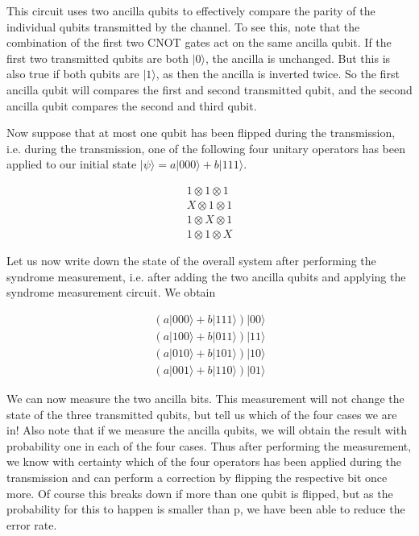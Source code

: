\documentclass[a4paper, draft]{article}
\theoremstyle{own}
\theoremstyle{remark}
\begin{document}
This circuit uses two ancilla qubits to effectively compare the parity of the individual qubits transmitted by the channel. To see this, note that the combination of the first two CNOT gates act on the same ancilla qubit. If the first two transmitted qubits are both $|0 \rangle$, the ancilla is unchanged. But this is also true if both qubits are $|1 \rangle$, as then the ancilla is inverted twice. So the first ancilla qubit will compares the first and second transmitted qubit, and the second ancilla qubit compares the second and third qubit.

Now suppose that at most one qubit has been flipped during the transmission, i.e. during the transmission, one of the following four unitary operators has been applied to our initial state $|\psi \rangle = a |000 \rangle + b |111 \rangle$. 

\begin{align*}
1 \otimes 1 \otimes 1 \\
X \otimes 1 \otimes 1 \\
1 \otimes X \otimes 1 \\
1 \otimes 1 \otimes X
\end{align*}

Let us now write down the state of the overall system after performing the syndrome measurement, i.e. after adding the two ancilla qubits and applying the syndrome measurement circuit. We obtain

\begin{align*}
(a |000\rangle + b |111 \rangle ) |00 \rangle \\
(a |100\rangle + b |011 \rangle ) |11 \rangle \\
(a |010\rangle + b |101 \rangle ) |10 \rangle \\
(a |001\rangle + b |110 \rangle ) |01 \rangle 
\end{align*}

We can now measure the two ancilla bits. This measurement will not change the state of the three transmitted qubits, but tell us which of the four cases we are in! Also note that if we measure the ancilla qubits, we will obtain the result with probability one in each of the four cases. Thus after performing the measurement, we know with certainty which of the four operators has been applied during the transmission and can perform a correction by flipping the respective bit once more. Of course this breaks down if more than one qubit is flipped, but as the probability for this to happen is smaller than p, we have been able to reduce the error rate.
\end{document}
